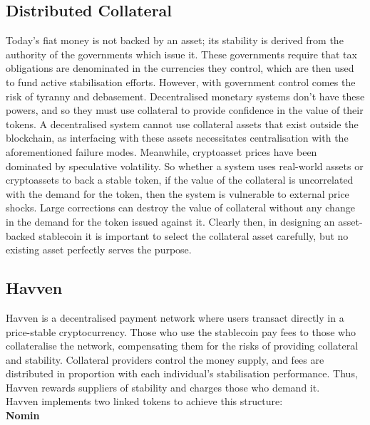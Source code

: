 \subsection{Distributed Collateral}

\noindent Today’s fiat money is not backed by an asset; its stability is
derived from the authority of the governments which issue it. These
governments require that tax obligations are denominated in the currencies
they control, which are then used to fund active stabilisation efforts.
However, with government control comes the risk of tyranny and debasement.
Decentralised monetary systems don’t have these powers, and so they must use
collateral to provide confidence in the value of their tokens. A
decentralised system cannot use collateral assets that exist outside the
blockchain, as interfacing with these assets necessitates centralisation with
the aforementioned failure modes. Meanwhile, cryptoasset prices have been
dominated by speculative volatility. So whether a system uses real-world
assets or cryptoassets to back a stable token, if the value of the collateral
is uncorrelated with the demand for the token, then the system is vulnerable
to external price shocks. Large corrections can destroy the value of
collateral without any change in the demand for the token issued against it.
Clearly then, in designing an asset-backed stablecoin it is important to
select the collateral asset carefully, but no existing asset perfectly serves
the purpose.

\subsection{Havven}

\noindent Havven is a decentralised payment network where users transact
directly in a price-stable cryptocurrency. Those who use the stablecoin pay
fees to those who collateralise the network, compensating them for the risks
of providing collateral and stability. Collateral providers control the money
supply, and fees are distributed in proportion with each individual’s
stabilisation performance. Thus, Havven rewards suppliers of stability and
charges those who demand it. \\

\noindent Havven implements two linked tokens to achieve this structure: \\

\noindent \textbf{Nomin}

\vspace{1mm}


